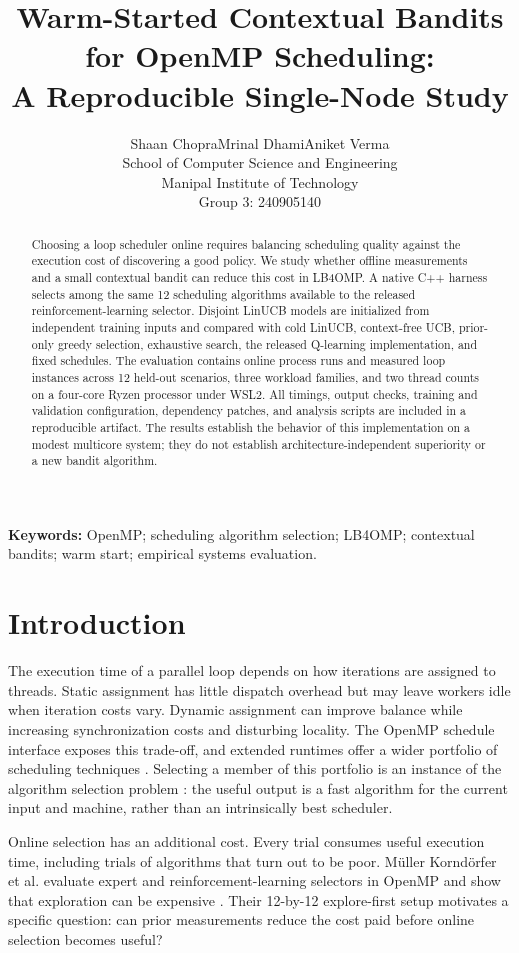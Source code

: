\documentclass[10pt,letterpaper]{article}
\title{\textbf{Warm-Started Contextual Bandits for OpenMP Scheduling:\\
A Reproducible Single-Node Study}}
\author{Shaan Chopra\quad Mrinal Dhami\quad Aniket Verma\\[3pt]
School of Computer Science and Engineering\\
Manipal Institute of Technology\\[3pt]
\small Group 3: 240905140\quad 240905026\quad 240905156}
\date{}
\begin{document}
\maketitle
\begin{abstract}
Choosing a loop scheduler online requires balancing scheduling quality against
the execution cost of discovering a good policy. We study whether offline
measurements and a small contextual bandit can reduce this cost in LB4OMP. A
native C++ harness selects among the same 12 scheduling algorithms available
to the released reinforcement-learning selector. Disjoint LinUCB models are
initialized from independent training inputs and compared with cold LinUCB,
context-free UCB, prior-only greedy selection, exhaustive search, the released
Q-learning implementation, and fixed schedules. The evaluation contains
\OnlineRuns{} online process runs and \LoopInstances{} measured loop instances
across 12 held-out scenarios, three workload families, and two thread counts
on a four-core Ryzen processor under WSL2. \AbstractFinding{}
All timings, output checks, training and validation configuration, dependency
patches, and analysis scripts are included in a reproducible artifact. The
results establish the behavior of this implementation on a modest multicore
system; they do not establish architecture-independent superiority or a new
bandit algorithm.
\end{abstract}
\noindent\textbf{Keywords:} OpenMP; scheduling algorithm selection; LB4OMP;
contextual bandits; warm start; empirical systems evaluation.

\section{Introduction}

The execution time of a parallel loop depends on how iterations are assigned
to threads. Static assignment has little dispatch overhead but may leave
workers idle when iteration costs vary. Dynamic assignment can improve balance
while increasing synchronization costs and disturbing locality. The OpenMP
schedule interface exposes this trade-off, and extended runtimes offer a wider
portfolio of scheduling techniques \cite{openmp,lb4omp}. Selecting a member of
this portfolio is an instance of the algorithm selection problem
\cite{rice}: the useful output is a fast algorithm for the current input and
machine, rather than an intrinsically best scheduler.

Online selection has an additional cost. Every trial consumes useful execution
time, including trials of algorithms that turn out to be poor. M\"uller
Kornd\"orfer et al. evaluate expert and reinforcement-learning selectors in
OpenMP and show that exploration can be expensive \cite{comparative}. Their
12-by-12 explore-first setup motivates a specific question: can prior
measurements reduce the cost paid before online selection becomes useful?
\end{document}
